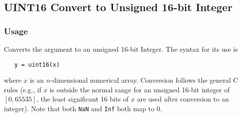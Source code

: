 %
%
%
\subsection{UINT16 Convert to Unsigned 16-bit Integer}
\subsubsection{Usage}
Converts the argument to an unsigned 16-bit Integer.  The syntax
for its use is
\begin{verbatim}
   y = uint16(x)
\end{verbatim}
where $x$ is an $n$-dimensional numerical array.  Conversion
follows the general C rules (e.g., if $x$ is outside the normal
range for an unsigned 16-bit integer of $[0,65535]$, the least significant
16 bits of $x$ are used after conversion to an integer).  Note that
both \verb|NaN| and \verb|Inf| both map to 0.
